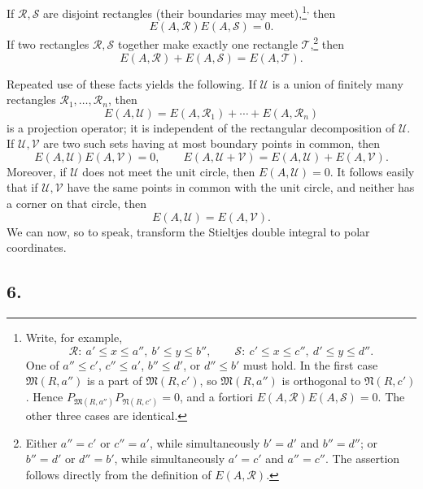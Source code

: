 ﻿\documentclass[paper=b5,fontsize=13pt,bookmarkpackage=false,twoside]{scrartcl}
\newcounter{translatornote}
\begin{document}
If \(\mathcal R,\mathcal S\) are disjoint rectangles (their boundaries
may meet),\footnote{\label{fn:70}Write, for example,
\[
 \mathcal R:\ a'\leq x\leq a'',\ b'\leq y\leq b'',\qquad
 \mathcal S:\ c'\leq x\leq c'',\ d'\leq y\leq d''.
\]
One of \(a''\leq c'\), \(c''\leq a'\), \(b''\leq d'\), or
\(d''\leq b'\) must hold.  In the first case
\(\mathfrak M(R,a'')\) is a part of \(\mathfrak M(R,c')\), so
\(\mathfrak M(R,a'')\) is orthogonal to \(\mathfrak N(R,c')\).  Hence
\(P_{\mathfrak M(R,a'')}P_{\mathfrak N(R,c')}=0\), and a fortiori
\(E(A,\mathcal R)E(A,\mathcal S)=0\).  The other three cases are
identical.}\textsuperscript{,} then
\[
  E(A,\mathcal R)E(A,\mathcal S)=0.
\]
If two rectangles \(\mathcal R,\mathcal S\) together make exactly one
rectangle \(\mathcal T\),\footnote{\label{fn:71}Either \(a''=c'\) or
\(c''=a'\), while simultaneously \(b'=d'\) and \(b''=d''\); or
\(b''=d'\) or \(d''=b'\), while simultaneously \(a'=c'\) and
\(a''=c''\).  The assertion follows directly from the definition of
\(E(A,\mathcal R)\).} then
\[
  E(A,\mathcal R)+E(A,\mathcal S)=E(A,\mathcal T).
\]

Repeated use of these facts yields the following.  If \(\mathcal U\)
is a union of finitely many rectangles
\(\mathcal R_1,\ldots,\mathcal R_n\), then
\[
  E(A,\mathcal U)
  =E(A,\mathcal R_1)+\cdots+E(A,\mathcal R_n)
\]
is a projection operator; it is independent of the rectangular
decomposition of \(\mathcal U\).  If \(\mathcal U,\mathcal V\) are two
such sets having at most boundary points in common, then
\[
  E(A,\mathcal U)E(A,\mathcal V)=0,\qquad
  E(A,\mathcal U+\mathcal V)
  =E(A,\mathcal U)+E(A,\mathcal V).
\]
Moreover, if \(\mathcal U\) does not meet the unit circle, then
\(E(A,\mathcal U)=0\).  It follows easily that if
\(\mathcal U,\mathcal V\) have the same points in common with the unit
circle, and neither has a corner on that circle, then
\[
  E(A,\mathcal U)=E(A,\mathcal V).
\]
We can now, so to speak, transform the Stieltjes double integral to
polar coordinates.

\subsection*{6.}
\label{appII:6}
\end{document}

